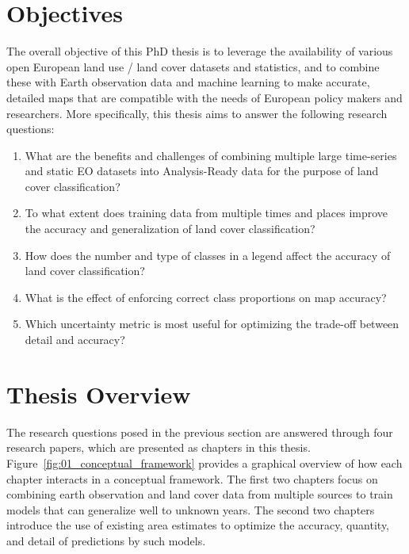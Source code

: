 \section{Objectives}
\label{sec:research_objectives}
The overall objective of this PhD thesis is to leverage the availability of various open European land use / land cover datasets and statistics, and to combine these with Earth observation data and machine learning to make accurate, detailed maps that are compatible with the needs of European policy makers and researchers. More specifically, this thesis aims to answer the following research questions:

\begin{enumerate}
\item %
What are the benefits and challenges of combining multiple large time-series and static EO datasets into Analysis-Ready data for the purpose of land cover classification?
\item %
To what extent does training data from multiple times and places improve the accuracy and generalization of land cover classification?
\item %
How does the number and type of classes in a legend affect the accuracy of land cover classification?
\item %
What is the effect of enforcing correct class proportions on map accuracy?
\item %
Which uncertainty metric is most useful for optimizing the trade-off between detail and accuracy?
\end{enumerate}

\section{Thesis Overview}

The research questions posed in the previous section are answered through four research papers, which are presented as chapters in this thesis. Figure~\ref{fig:01_conceptual_framework} provides a graphical overview of how each chapter interacts in a conceptual framework. The first two chapters focus on combining earth observation and land cover data from multiple sources to train models that can generalize well to unknown years. The second two chapters introduce the use of existing area estimates to optimize the accuracy, quantity, and detail of predictions by such models.

